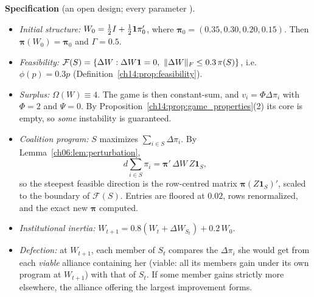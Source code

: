 \documentclass[../solutions_manual.tex]{subfiles}
\begin{document}
\textbf{Specification} (an open design; every parameter \illustrative).
\begin{itemize}
\item \emph{Initial structure:} $W_0 = \tfrac12 I + \tfrac12\mathbf{1}\pi_0'$, where $\boldsymbol{\pi}_0 = (0.35, 0.30, 0.20, 0.15)$. Then $\boldsymbol{\pi}(W_0) = \boldsymbol{\pi}_0$ and $\Gamma = 0.5$.
\item \emph{Feasibility:} $\mathcal{F}(S) = \{\Delta W : \Delta W\mathbf{1} = 0,\ \|\Delta W\|_F \le 0.3\,\pi(S)\}$, i.e.\ $\phi(p) = 0.3p$ (Definition~\ref{ch14:prop:feasibility}).
\item \emph{Surplus:} $\Omega(W) \equiv 4$. The game is then constant-sum, and $v_i = \Phi\Delta\pi_i$ with $\Phi = 2$ and $\Psi = 0$. By Proposition~\ref{ch14:prop:game_properties}(2) its core is empty, so \emph{some} instability is guaranteed.
\item \emph{Coalition program:} $S$ maximizes $\sum_{i\in S}\Delta\pi_i$. By Lemma~\ref{ch06:lem:perturbation},
\[
d\textstyle\sum_{i\in S}\pi_i = \boldsymbol{\pi}'\,\Delta W\, Z\mathbf{1}_S,
\]
so the steepest feasible direction is the row-centred matrix $\boldsymbol{\pi}(Z\mathbf{1}_S)'$, scaled to the boundary of $\mathcal{F}(S)$. Entries are floored at $0.02$, rows renormalized, and the exact new $\boldsymbol{\pi}$ computed.
\item \emph{Institutional inertia:} $W_{t+1} = 0.8(W_t + \Delta W_{S_t}) + 0.2\,W_0$.
\item \emph{Defection:} at $W_{t+1}$, each member of $S_t$ compares the $\Delta\pi_i$ she would get from each \emph{viable} alliance containing her (viable: all its members gain under its own program at $W_{t+1}$) with that of $S_t$. If some member gains strictly more elsewhere, the alliance offering the largest improvement forms.
\end{itemize}
\end{document}
